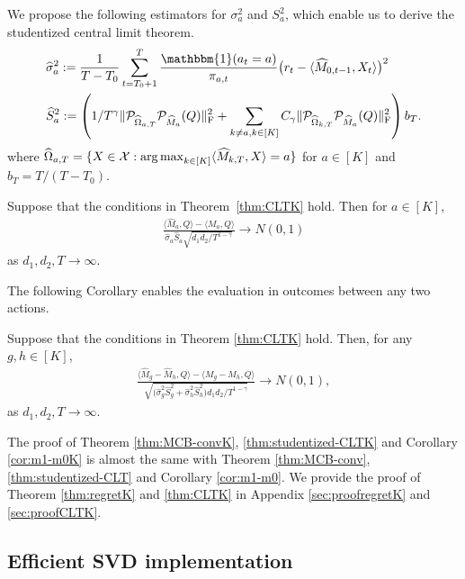 \documentclass[12pt]{article}
\newcommand\fro[1]{\| #1 \|_{\rm{F}}}
\newcommand{\inp}[2]{\langle #1,#2\rangle}
\newcommand{\argmax}{\mathop{\rm arg\max}}
\def\calP{{\mathcal P}}
\def\hat{\widehat}
\theoremstyle{plain}
\begin{document}
We propose the following estimators for $\sigma_a^2$ and $S_a^2$, which enable us to derive the studentized central limit theorem.
\begin{align*}
    &\hat\sigma_a^2:=\frac{1}{T-T_0}\sum_{t=T_0+1}^T \frac{\mathbbm{1}(a_t=a)}{\pi_{a,t}} \big(r_t-\langle \hat M_{0, t-1}, X_t\rangle\big)^2 \\
    &\widehat{S}_a^2:= \left(1/T^{\gamma}\fro{\calP_{\widehat{\Omega}_{a,T}}\calP_{\hat M_a}(Q)}^2+\sum_{k\neq a, k\in [K]} C_{\gamma}\fro{\calP_{\widehat{\Omega}_{k,T}}\calP_{\hat M_a}(Q)}^2\right)b_T.
\end{align*}
where $\widehat{\Omega}_{a,T}=\{X\in \mathcal{X}: \argmax_{k\in [K]}\inp{\widehat{M}_{k,T}}{X}=a\}$ for $a\in [K]$ and $b_T=T/(T-T_0)$. 
\begin{thm}
\label{thm:studentized-CLTK}
Suppose that the conditions in Theorem~\ref{thm:CLTK} hold. Then for $a\in [K]$, 
\begin{align*}
    \frac{\langle \hat M_a, Q\rangle - \langle M_a, Q\rangle}{\hat\sigma_a \widehat{S}_a \sqrt{d_1d_2/T^{1-\gamma}}}\rightarrow N(0,1)
\end{align*}
as $d_1,d _2, T\to\infty$.  
\end{thm}
The following Corollary enables the evaluation in outcomes between any two actions. 
\begin{cor}
    \label{cor:m1-m0K}
     Suppose that the conditions in Theorem \ref{thm:CLTK} hold. Then, for any $g,h\in [K]$, 
        \begin{align*}
        \frac{\langle \hat M_g -\hat M_h, Q\rangle - \langle M_g-M_h, Q\rangle}{\sqrt{\big(\hat\sigma_g^2\widehat{S}_g^2+\hat\sigma_h^2\widehat{S}_h^2 \big)d_1d_2/T^{1-\gamma}}} \longrightarrow N(0,1),
        \end{align*}
        as $d_1,d _2, T\to\infty$. 
\end{cor}


The proof of Theorem \ref{thm:MCB-convK}, \ref{thm:studentized-CLTK} and Corollary \ref{cor:m1-m0K} is  almost the same with Theorem \ref{thm:MCB-conv}, \ref{thm:studentized-CLT} and Corollary \ref{cor:m1-m0}. We provide the proof of Theorem \ref{thm:regretK} and \ref{thm:CLTK} in Appendix \ref{sec:proofregretK} and \ref{sec:proofCLTK}.

\subsection{Efficient SVD implementation} \label{sec:practical}
\newtheorem{lem}{Lemma}[section]
\end{document}
